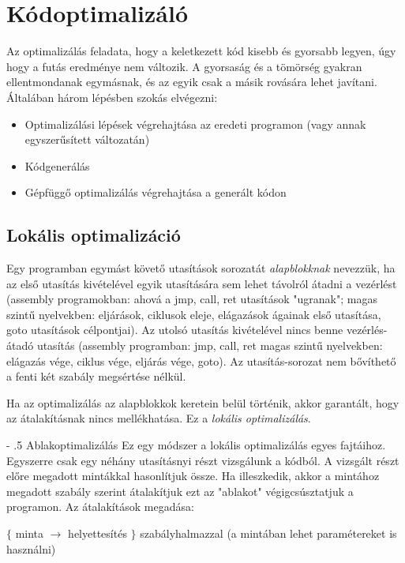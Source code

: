 \documentclass[margin=0px]{article}
\makeatletter
\renewcommand\paragraph{%
    \@startsection{paragraph}{4}{0mm}%
    {-\baselineskip}%
    {.5\baselineskip}%
    {\normalfont\normalsize\bfseries}}
\makeatother
\begin{document}
\section{Kódoptimalizáló}

Az optimalizálás feladata, hogy a keletkezett kód kisebb és gyorsabb legyen, úgy hogy a futás eredménye nem változik. A gyorsaság és a tömörség gyakran ellentmondanak egymásnak, és az egyik csak a másik rovására lehet javítani. Általában három lépésben szokás elvégezni:

\begin{itemize}
    \item
          Optimalizálási lépések végrehajtása az eredeti programon (vagy annak egyszerűsített változatán)
    \item
          Kódgenerálás
    \item
          Gépfüggő optimalizálás végrehajtása a generált kódon
\end{itemize}

\subsection{Lokális optimalizáció}

Egy programban egymást követő utasítások sorozatát \textit{alapblokknak} nevezzük, ha az első utasítás kivételével egyik utasítására sem lehet távolról átadni a vezérlést (assembly programokban: ahová a jmp, call, ret utasítások "ugranak"; magas szintű nyelvekben: eljárások, ciklusok eleje, elágazások ágainak első utasítása, goto utasítások célpontjai). Az utolsó utasítás kivételével nincs benne vezérlés-átadó utasítás (assembly programban: jmp, call, ret magas szintű nyelvekben: elágazás vége, ciklus vége, eljárás vége, goto). Az utasítás-sorozat nem bővíthető a fenti két szabály megsértése nélkül.

Ha az optimalizálás az alapblokkok keretein belül történik, akkor garantált, hogy az átalakításnak nincs mellékhatása. Ez a \textit{lokális optimalizálás}.

\paragraph{Ablakoptimalizálás}
Ez egy módszer a lokális optimalizálás egyes fajtáihoz. Egyszerre csak egy néhány utasításnyi részt vizsgálunk a kódból. A vizsgált részt előre megadott mintákkal hasonlítjuk össze. Ha illeszkedik, akkor a mintához megadott szabály szerint átalakítjuk ezt az "ablakot" végigcsúsztatjuk a programon. Az átalakítások megadása:
\begin{center}
    $ \lbrace$ minta $ \rightarrow $ helyettesítés $\rbrace$ szabályhalmazzal
    (a mintában lehet paramétereket is használni)
\end{center}
\end{document}
